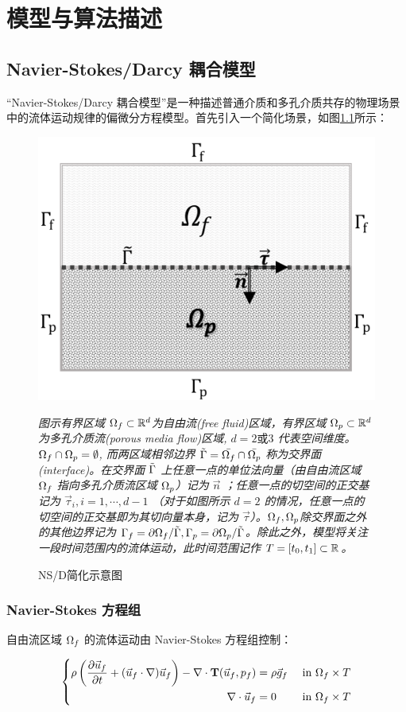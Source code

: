 
\chapter{模型与算法描述}

\section{Navier-Stokes/Darcy 耦合模型}

“Navier-Stokes/Darcy 耦合模型”是一种描述普通介质和多孔介质共存的物理场景中的流体运动规律的偏微分方程模型。首先引入一个简化场景，如图\ref{fig:NS/D}所示：

\begin{figure}[H]
  \centering
  \includegraphics[width=0.5\linewidth]{images/NS-D简化示意图.pdf}
  \caption*{\small \textit{图示有界区域 $\Of \subset \R[d] $为自由流(free fluid)区域，有界区域 $\Op \subset \R[d]$为多孔介质流(porous media flow)区域, $d = 2 \text{或} 3$ 代表空间维度。$\Of \cap \Op = \emptyset$, 而两区域相邻边界 $\iB = \bar{\Of} \cap \bar{\Op}$ 称为交界面(interface)。在交界面 $\iB$ 上任意一点的单位法向量（由自由流区域 $\Of$ 指向多孔介质流区域 $\Op$）记为 $\vec n$ ；任意一点的切空间的正交基记为 $\vec \tau_i,i=1,\cdots,d-1$ （对于如图所示 $d=2$ 的情况，任意一点的切空间的正交基即为其切向量本身，记为 $\vec \tau$）。$\Of,\Op$除交界面之外的其他边界记为 $\Bf = \partial \Of / \iB,\Bp = \partial \Op / \iB$。除此之外，模型将关注一段时间范围内的流体运动，此时间范围记作 $ T = \left[ t_0,t_1 \right] \subset \R$。}}
  \caption{NS/D简化示意图}
  \label{fig:NS/D}
\end{figure}

\subsection{Navier-Stokes 方程组}

自由流区域 $\Of$ 的流体运动由 Navier-Stokes 方程组控制：

\begin{equation}\label{eq:NS}
\left\{
    \begin{aligned}
        \rho \left(\toD{\Uf}{t} + (\Uf \cdot \gradOp) \Uf \right) - \gradOp \cdot \opTf &= \rho\gf & & \textrm{ in } \Df\\  
        \gradOp \cdot \Uf &= 0 & & \text{ in } \Df
    \end{aligned}
\right.
\end{equation}

